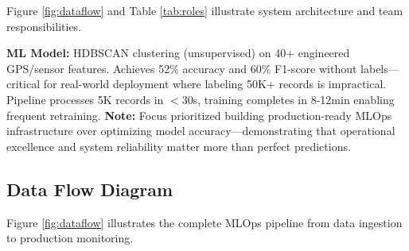 \documentclass[11pt,a4paper]{article}
\begin{document}
Figure \ref{fig:dataflow} and Table \ref{tab:roles} illustrate system architecture and team responsibilities.

\textbf{ML Model:} HDBSCAN clustering (unsupervised) on 40+ engineered GPS/sensor features. Achieves 52\% accuracy and 60\% F1-score without labels—critical for real-world deployment where labeling 50K+ records is impractical. Pipeline processes 5K records in $<$30s, training completes in 8-12min enabling frequent retraining. \textbf{Note:} Focus prioritized building production-ready MLOps infrastructure over optimizing model accuracy—demonstrating that operational excellence and system reliability matter more than perfect predictions.

\subsection{Data Flow Diagram}

Figure \ref{fig:dataflow} illustrates the complete MLOps pipeline from data ingestion to production monitoring.
\end{document}
